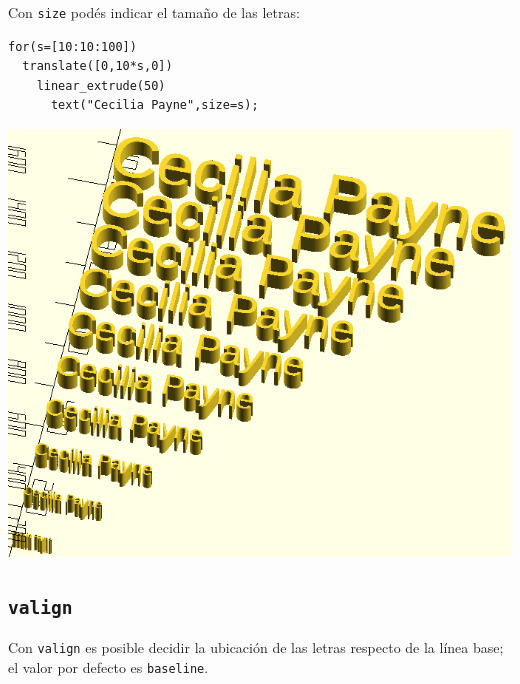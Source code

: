 \guillemotright Con \lstinline!size! podés indicar el tamaño de las
letras:

\begin{center}
\begin{minipage}[]{.55\textwidth}%
 \begin{lstlisting}
for(s=[10:10:100])
  translate([0,10*s,0])
    linear_extrude(50)
      text("Cecilia Payne",size=s);
\end{lstlisting}%
\end{minipage}\hfill
\begin{minipage}[]{.45\textwidth}%
  \centering
  \includegraphics[width=1\textwidth]{imagenes/cecilia-payne-size}
\end{minipage}
\end{center}

\subsection{\texttt{valign}}

\guillemotright Con \lstinline!valign! es posible decidir la ubicación
de las letras respecto de la línea base; el valor por defecto es
\lstinline!baseline!.


